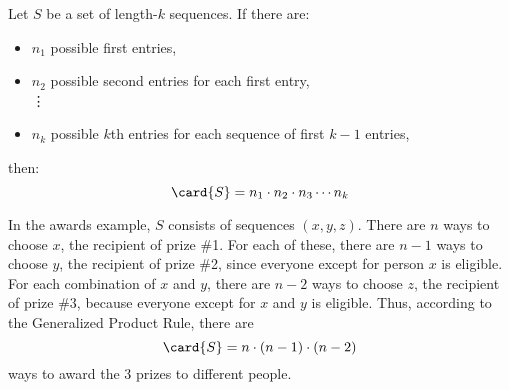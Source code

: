 
\begin{rul}
Let $S$ be a set of length-$k$ sequences.  If there are:
%
\begin{itemize}
\item $n_1$ possible first entries,
\item $n_2$ possible second entries for each first entry,\\
\iffalse
\item $n_3$ possible third entries for each sequence of first and
second entries,\\
\fi
\vdots
\item $n_k$ possible $k$th entries for each sequence of first $k-1$
  entries,
\end{itemize}
%
then:
%
\[
\card{S} = n_1 \cdot n_2 \cdot n_3 \cdots n_k
\]
\end{rul}

In the awards example, $S$ consists of sequences $(x, y, z)$.  There
are $n$ ways to choose $x$, the recipient of prize \#1.  For each of
these, there are $n-1$ ways to choose $y$, the recipient of prize \#2,
since everyone except for person $x$ is eligible.  For each
combination of $x$ and $y$, there are $n-2$ ways to choose $z$, the
recipient of prize \#3, because everyone except for $x$ and $y$ is
eligible.  Thus, according to the Generalized Product Rule, there are
%
\[
\card{S} = n \cdot (n-1) \cdot (n-2)
\]
%
ways to award the 3 prizes to different people.

